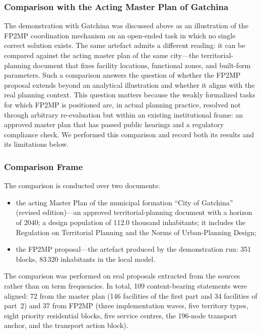 \subsubsection{Comparison with the Acting Master Plan of Gatchina}
\label{sec:comparison-genplan}
 
The demonstration with Gatchina was discussed above as an illustration of the FP2MP coordination mechanism on an open-ended task in which no single correct solution exists. The same artefact admits a different reading: it can be compared against the acting master plan of the same city---the territorial-planning document that fixes facility locations, functional zones, and built-form parameters. Such a comparison answers the question of whether the FP2MP proposal extends beyond an analytical illustration and whether it aligns with the real planning context. This question matters because the weakly formalized tasks for which FP2MP is positioned are, in actual planning practice, resolved not through arbitrary re-evaluation but within an existing institutional frame: an approved master plan that has passed public hearings and a regulatory compliance check. We performed this comparison and record both its results and its limitations below.
 
\subsubsection{Comparison Frame}
\label{sec:comparison-frame}
 
The comparison is conducted over two documents:
 
\begin{itemize}
  \item the acting Master Plan of the municipal formation ``City of Gatchina'' (revised edition)---an approved territorial-planning document with a horizon of 2040; a design population of 112.0 thousand inhabitants; it includes the Regulation on Territorial Planning and the Norms of Urban-Planning Design;
  \item the FP2MP proposal---the artefact produced by the demonstration run: 351 blocks, 83\,320 inhabitants in the local model.
\end{itemize}
 
The comparison was performed on real proposals extracted from the sources rather than on term frequencies. In total, 109 content-bearing statements were aligned: 72 from the master plan (146 facilities of the first part and 34 facilities of part~2) and 37 from FP2MP (three implementation waves, five territory types, eight priority residential blocks, five service centres, the 196-node transport anchor, and the transport action block).
 
